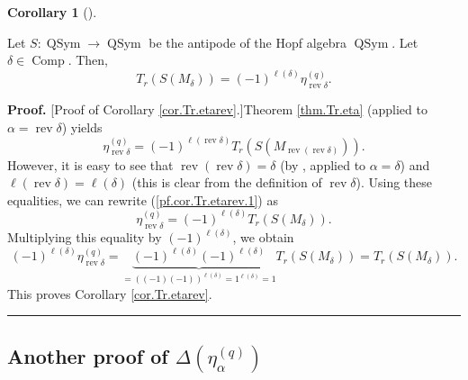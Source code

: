 \documentclass[numbers=enddot,12pt,final,onecolumn,notitlepage]{scrartcl}%
\theoremstyle{definition}
\newtheorem{coro}[theo]{Corollary}
\newenvironment{corollary}[1][]
{\begin{coro}[#1]\begin{leftbar}}
{\end{leftbar}\end{coro}}
\newenvironment{proof}[1][Proof]{\noindent\textbf{#1.} }{\ \rule{0.5em}{0.5em}}
\newenvironment{verlong}{}{}
\begin{document}
\begin{verlong}


\begin{corollary}
\label{cor.Tr.etarev}Let $S:\operatorname*{QSym}\rightarrow
\operatorname*{QSym}$ be the antipode of the Hopf algebra
$\operatorname*{QSym}$. Let $\delta\in\operatorname*{Comp}$. Then,%
\[
T_{r}\left(  S\left(  M_{\delta}\right)  \right)  =\left(  -1\right)
^{\ell\left(  \delta\right)  }\eta_{\operatorname*{rev}\delta}^{\left(
q\right)  }.
\]

\end{corollary}

\begin{proof}
[Proof of Corollary \ref{cor.Tr.etarev}.]Theorem \ref{thm.Tr.eta} (applied to
$\alpha=\operatorname*{rev}\delta$) yields%
\begin{equation}
\eta_{\operatorname*{rev}\delta}^{\left(  q\right)  }=\left(  -1\right)
^{\ell\left(  \operatorname*{rev}\delta\right)  }T_{r}\left(  S\left(
M_{\operatorname*{rev}\left(  \operatorname*{rev}\delta\right)  }\right)
\right)  . \label{pf.cor.Tr.etarev.1}%
\end{equation}
However, it is easy to see that $\operatorname*{rev}\left(
\operatorname*{rev}\delta\right)  =\delta$ (by \cite[Proposition 3.4]{comps},
applied to $\alpha=\delta$) and $\ell\left(  \operatorname*{rev}\delta\right)
=\ell\left(  \delta\right)  $ (this is clear from the definition of
$\operatorname*{rev}\delta$). Using these equalities, we can rewrite
(\ref{pf.cor.Tr.etarev.1}) as%
\[
\eta_{\operatorname*{rev}\delta}^{\left(  q\right)  }=\left(  -1\right)
^{\ell\left(  \delta\right)  }T_{r}\left(  S\left(  M_{\delta}\right)
\right)  .
\]
Multiplying this equality by $\left(  -1\right)  ^{\ell\left(  \delta\right)
}$, we obtain%
\[
\left(  -1\right)  ^{\ell\left(  \delta\right)  }\eta_{\operatorname*{rev}%
\delta}^{\left(  q\right)  }=\underbrace{\left(  -1\right)  ^{\ell\left(
\delta\right)  }\left(  -1\right)  ^{\ell\left(  \delta\right)  }}_{=\left(
\left(  -1\right)  \left(  -1\right)  \right)  ^{\ell\left(  \delta\right)
}=1^{\ell\left(  \delta\right)  }=1}T_{r}\left(  S\left(  M_{\delta}\right)
\right)  =T_{r}\left(  S\left(  M_{\delta}\right)  \right)  .
\]
This proves Corollary \ref{cor.Tr.etarev}.
\end{proof}
\end{verlong}

\subsection{Another proof of $\Delta\left(  \eta_{\alpha}^{\left(  q\right)
}\right)  $}
\end{document}

